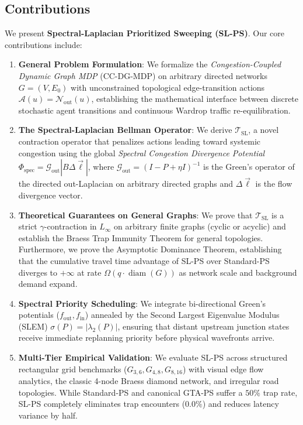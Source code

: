 \documentclass[11pt,a4paper]{article}
\begin{document}
\subsection{Contributions}
We present \textbf{Spectral-Laplacian Prioritized Sweeping (SL-PS)}. Our core contributions include:
\begin{enumerate}
    \item \textbf{General Problem Formulation}: We formalize the \textit{Congestion-Coupled Dynamic Graph MDP} (CC-DG-MDP) on arbitrary directed networks $G = (V, E_0)$ with unconstrained topological edge-transition actions $\mathcal{A}(u) = \mathcal{N}_{\text{out}}(u)$, establishing the mathematical interface between discrete stochastic agent transitions and continuous Wardrop traffic re-equilibration.
    \item \textbf{The Spectral-Laplacian Bellman Operator}: We derive $\mathcal{T}_{\text{SL}}$, a novel contraction operator that penalizes actions leading toward systemic congestion using the global \textit{Spectral Congestion Divergence Potential} $\Phi_{\text{spec}} = \mathcal{G}_{\text{out}} |B \Delta \vec{\ell}|$, where $\mathcal{G}_{\text{out}} = (I - P + \eta I)^{-1}$ is the Green's operator of the directed out-Laplacian on arbitrary directed graphs and $\Delta \vec{\ell}$ is the flow divergence vector.
    \item \textbf{Theoretical Guarantees on General Graphs}: We prove that $\mathcal{T}_{\text{SL}}$ is a strict $\gamma$-contraction in $L_\infty$ on arbitrary finite graphs (cyclic or acyclic) and establish the Braess Trap Immunity Theorem for general topologies. Furthermore, we prove the Asymptotic Dominance Theorem, establishing that the cumulative travel time advantage of SL-PS over Standard-PS diverges to $+\infty$ at rate $\Omega(q \cdot \operatorname{diam}(G))$ as network scale and background demand expand.
    \item \textbf{Spectral Priority Scheduling}: We integrate bi-directional Green's potentials ($f_{\text{out}}, f_{\text{in}}$) annealed by the Second Largest Eigenvalue Modulus (SLEM) $\sigma(P) = |\lambda_2(P)|$, ensuring that distant upstream junction states receive immediate replanning priority before physical wavefronts arrive.
    \item \textbf{Multi-Tier Empirical Validation}: We evaluate SL-PS across structured rectangular grid benchmarks ($G_{3,6}, G_{4,8}, G_{8,16}$) with visual edge flow analytics, the classic 4-node Braess diamond network, and irregular road topologies. While Standard-PS and canonical GTA-PS suffer a $50\%$ trap rate, SL-PS completely eliminates trap encounters ($0.0\%$) and reduces latency variance by half.
\end{enumerate}
\end{document}

